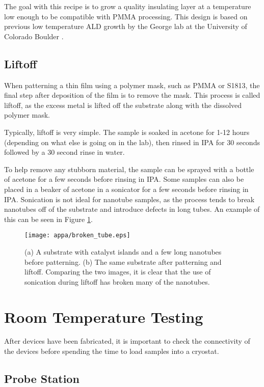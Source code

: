 The goal with this recipe is to grow a quality insulating layer at a temperature low enough to be compatible with PMMA processing. This design is based on previous low temperature ALD growth by the George lab at the University of Colorado Boulder \cite{Elam2002, Groner2004}.

\subsection{Liftoff}
\label{subsec:liftoff}

When patterning a thin film using a polymer mask, such as PMMA or S1813, the final step after deposition of the film is to remove the mask. This process is called liftoff, as the excess metal is lifted off the substrate along with the dissolved polymer mask.

Typically, liftoff is very simple. The sample is soaked in acetone for 1-12 hours (depending on what else is going on in the lab), then rinsed in IPA for 30 seconds followed by a 30 second rinse in water. 

To help remove any stubborn material, the sample can be sprayed with a bottle of acetone for a few seconds before rinsing in IPA. Some samples can also be placed in a beaker of acetone in a sonicator for a few seconds before rinsing in IPA. Sonication is not ideal for nanotube samples, as the process tends to break nanotubes off of the substrate and introduce defects in long tubes. An example of this can be seen in Figure \ref{fig:broken_tube}.

\begin{figure}
	\centering
	\texttt{[image: appa/broken\_tube.eps]}
	\caption{(a) A substrate with catalyst islands and a few long nanotubes before patterning. (b) The same substrate after patterning and liftoff. Comparing the two images, it is clear that the use of sonication during liftoff has broken many of the nanotubes.}
	\label{fig:broken_tube}
\end{figure}

\section{Room Temperature Testing}

After devices have been fabricated, it is important to check the connectivity of the devices before spending the time to load samples into a cryostat.

\subsection{Probe Station}
\label{subsec:probe_station}

